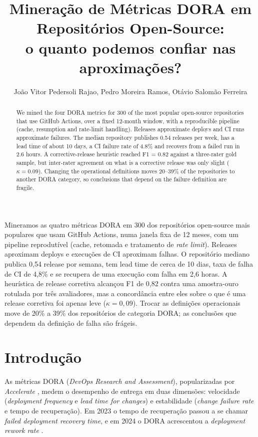 \documentclass[12pt]{article}
\title{Mineração de Métricas DORA em Repositórios Open-Source:\\o quanto podemos confiar nas aproximações?}
\author{João Vitor Pedersoli Rajao\inst{1}, Pedro Moreira Ramos\inst{1}, Otávio Salomão Ferreira\inst{1}}
\begin{document}
\maketitle

\begin{abstract}
We mined the four DORA metrics for 300 of the most popular open-source repositories that use GitHub Actions, over a fixed 12-month window, with a reproducible pipeline (cache, resumption and rate-limit handling). Releases approximate deploys and CI runs approximate failures. The median repository publishes 0.54 releases per week, has a lead time of about 10 days, a CI failure rate of 4.8\% and recovers from a failed run in 2.6 hours. A corrective-release heuristic reached F1 = 0.82 against a three-rater gold sample, but inter-rater agreement on what is a corrective release was only slight ($\kappa = 0.09$). Changing the operational definitions moves 20--39\% of the repositories to another DORA category, so conclusions that depend on the failure definition are fragile.
\end{abstract}

\begin{resumo}
Mineramos as quatro métricas DORA em 300 dos repositórios open-source mais populares que usam GitHub Actions, numa janela fixa de 12 meses, com um pipeline reprodutível (cache, retomada e tratamento de \textit{rate limit}). Releases aproximam deploys e execuções de CI aproximam falhas. O repositório mediano publica 0,54 release por semana, tem lead time de cerca de 10 dias, taxa de falha de CI de 4,8\% e se recupera de uma execução com falha em 2,6 horas. A heurística de release corretiva alcançou F1 de 0,82 contra uma amostra-ouro rotulada por três avaliadores, mas a concordância entre eles sobre o que é uma release corretiva foi apenas leve ($\kappa = 0{,}09$). Trocar as definições operacionais move de 20\% a 39\% dos repositórios de categoria DORA; as conclusões que dependem da definição de falha são frágeis.
\end{resumo}

\section{Introdução}

As métricas DORA (\textit{DevOps Research and Assessment}), popularizadas por \textit{Accelerate} \cite{forsgren2018accelerate}, medem o desempenho de entrega em duas dimensões: velocidade (\textit{deployment frequency} e \textit{lead time for changes}) e estabilidade (\textit{change failure rate} e tempo de recuperação). Em 2023 o tempo de recuperação passou a se chamar \textit{failed deployment recovery time}, e em 2024 o DORA acrescentou a \textit{deployment rework rate} \cite{dora2024history}.
\end{document}
